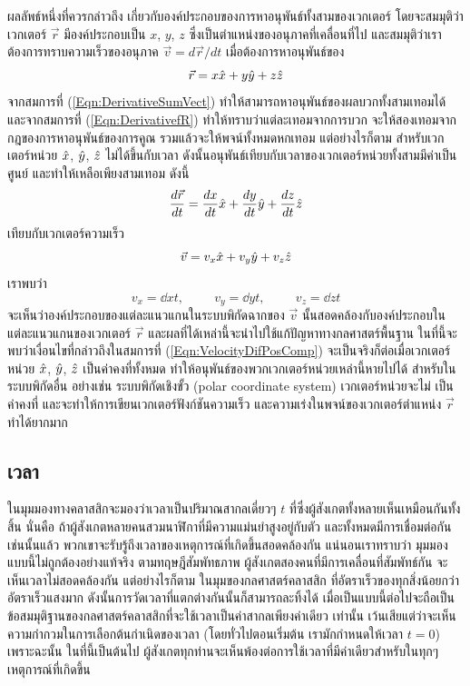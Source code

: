 ผลลัพธ์หนึ่งที่ควรกล่าวถึง เกี่ยวกับองค์ประกอบของการหาอนุพันธ์ทั้งสามของเวกเตอร์ โดยจะสมมุติว่าเวกเตอร์ $\vec{r}$ มีองค์ประกอบเป็น $x$, $y$, $z$ ซึ่งเป็นตำแหน่งของอนุภาคที่เคลื่อนที่ไป และสมมุติว่าเราต้องการทราบความเร็วของอนุภาค $\vec{v} = d\vec{r}/dt$ เมื่อต้องการหาอนุพันธ์ของ
\begin{equation}\label{Eqn:VecR}
\vec{r} = x\hat{x} + y\hat{y} + z\hat{z}
\end{equation}
จากสมการที่ (\ref{Eqn:DerivativeSumVect}) ทำให้สามารถหาอนุพันธ์ของผลบวกทั้งสามเทอมได้ และจากสมการที่ (\ref{Eqn:DerivativefR}) ทำให้ทราบว่าแต่ละเทอมจากการบวก จะให้สองเทอมจากกฎของการหาอนุพันธ์ของการคูณ รวมแล้วจะให้พจน์ทั้งหมดหกเทอม แต่อย่างไรก็ตาม สำหรับเวกเตอร์หน่วย $\hat{x}$, $\hat{y}$, $\hat{z}$ ไม่ได้ขึ้นกับเวลา ดังนั้นอนุพันธ์เทียบกับเวลาของเวกเตอร์หน่วยทั้งสามมีค่าเป็นศูนย์ และทำให้เหลือเพียงสามเทอม ดังนี้
\begin{equation}\label{Eqn:DifVecRt}
\frac{d{\vec{r}}}{d{t}} = \frac{d{x}}{d{t}}\hat{x} + \frac{d{y}}{d{t}}\hat{y} + \frac{d{z}}{d{t}}\hat{z}
\end{equation}
เทียบกับเวกเตอร์ความเร็ว
\begin{equation}\label{Eqn:VecVelocity}
\vec{v} = v_x\hat{x} + v_y\hat{y} + v_z\hat{z}
\end{equation}
เราพบว่า
\begin{equation}\label{Eqn:VelocityDifPosComp}
v_x = \dd{x}{t}, \hspace{1cm} v_y = \dd{y}{t}, \hspace{1cm} v_z = \dd{z}{t}
\end{equation}
จะเห็นว่าองค์ประกอบของแต่ละแนวแกนในระบบพิกัดฉากของ $\vec{v}$ นั้นสอดคล้องกับองค์ประกอบในแต่ละแนวแกนของเวกเตอร์ $\vec{r}$ และผลที่ได้เหล่านี้จะนำไปใช้แก้ปัญหาทางกลศาสตร์พื้นฐาน ในที่นี้จะพบว่าเงื่อนไขที่กล่าวถึงในสมการที่ (\ref{Eqn:VelocityDifPosComp}) จะเป็นจริงก็ต่อเมื่อเวกเตอร์หน่วย $\hat{x}$, $\hat{y}$, $\hat{z}$ เป็นค่าคงที่ทั้งหมด ทำให้อนุพันธ์ของพวกเวกเตอร์หน่วยเหล่านี้หายไปได้ สำหรับในระบบพิกัดอื่น อย่างเช่น ระบบพิกัดเชิงขั้ว (polar coordinate system) เวกเตอร์หน่วยจะ$\textit{ไม่}$ เป็นค่าคงที่ และจะทำให้การเขียนเวกเตอร์ฟังก์ชันความเร็ว และความเร่งในพจน์ของเวกเตอร์ตำแหน่ง $\vec{r}$ ทำได้ยากมาก


\subsection{เวลา}
\label{SubSec:Time}

ในมุมมองทางคลาสสิกจะมองว่าเวลาเป็นปริมาณสากลเดี่ยวๆ $t$ ที่ซึ่งผู้สังเกตทั้งหลายเห็นเหมือนกันทั้งสิ้น นั่นคือ ถ้าผู้สังเกตหลายคนสวมนาฬิกาที่มีความแม่นยำสูงอยู่กับตัว และทั้งหมดมีการเชื่อมต่อกัน เช่นนั้นแล้ว พวกเขาจะรับรู้ถึงเวลาของเหตุการณ์ที่เกิดขึ้นสอดคล้องกัน แน่นอนเราทราบว่า มุมมองแบบนี้ไม่ถูกต้องอย่างแท้จริง ตามทฤษฎีสัมพัทธภาพ ผู้สังเกตสองคนที่มีการเคลื่อนที่สัมพัทธ์กัน จะเห็นเวลา$\textit{ไม่}$สอดคล้องกัน แต่อย่างไรก็ตาม ในมุมของกลศาสตร์คลาสสิก ที่อัตราเร็วของทุกสิ่งน้อยกว่าอัตราเร็วแสงมาก ดังนั้นการวัดเวลาที่แตกต่างกันนั้นก็สามารถละทิ้งได้ เมื่อเป็นแบบนี้ต่อไปจะถือเป็นข้อสมมุติฐานของกลศาสตร์คลาสสิกที่จะใช้เวลาเป็นค่าสากลเพียงค่าเดียว
เท่านั้น เว้นเสียแต่ว่าจะเห็นความกำกวมในการเลือกต้นกำเนิดของเวลา (โดยทั่วไปตอนเริ่มต้น เรามักกำหนดให้เวลา $t = 0$) เพราะฉะนั้น ในที่นี้เป็นต้นไป ผู้สังเกตทุกท่านจะเห็นพ้องต่อการใช้เวลาที่มีค่าเดียวสำหรับในทุกๆเหตุการณ์ที่เกิดขึ้น

